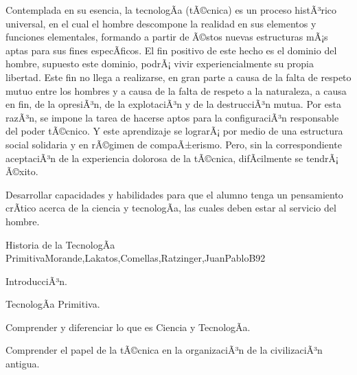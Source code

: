 \begin{syllabus}


\begin{justification}

Contemplada en su esencia, la tecnologÃ­a (tÃ©cnica) es un proceso histÃ³rico universal, en el cual el hombre descompone la realidad en sus elementos y funciones elementales, formando a partir de Ã©stos nuevas estructuras mÃ¡s aptas para sus fines especÃ­ficos.
El fin positivo de este hecho es el dominio del hombre,  supuesto este dominio, podrÃ¡ vivir experiencialmente su propia libertad. Este fin no llega a realizarse, en gran parte a causa de la falta de respeto mutuo entre los hombres y a causa de la falta de respeto a la naturaleza, a causa en fin, de la opresiÃ³n, de la explotaciÃ³n y de la destrucciÃ³n mutua.
Por esta razÃ³n, se impone la tarea de hacerse aptos para la configuraciÃ³n responsable del poder tÃ©cnico. Y este aprendizaje se lograrÃ¡ por medio de una estructura social solidaria y en rÃ©gimen de compaÃ±erismo. Pero, sin la correspondiente aceptaciÃ³n de la experiencia dolorosa de la tÃ©cnica, difÃ­cilmente se tendrÃ¡ Ã©xito.
\end{justification}

\begin{goals}
\item Desarrollar capacidades y habilidades para que el alumno tenga un pensamiento crÃ­tico acerca de  la ciencia y tecnologÃ­a, las cuales deben estar al servicio del hombre.
\end{goals}

\begin{outcomes}
\end{outcomes}

\begin{unit}{Historia de la TecnologÃ­a Primitiva}{Morande,Lakatos,Comellas,Ratzinger,JuanPabloB}{9}{2}
\begin{topics}
      \item IntroducciÃ³n.
      \item TecnologÃ­a Primitiva.
\end{topics}

\begin{unitgoals}
	\item Comprender y diferenciar lo que es Ciencia y TecnologÃ­a. 
 	\item Comprender el papel de la tÃ©cnica en la organizaciÃ³n de la civilizaciÃ³n antigua.
\end{unitgoals}
\end{unit}


\end{syllabus}
